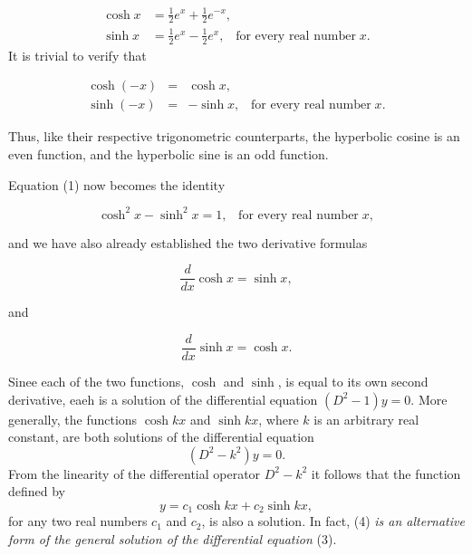 \begin{equation}
\begin{array}{ll}
\cosh x &= \frac{1}{2}e^x + \frac{1}{2}e^{-x},  \\ 
\sinh x &= \frac{1}{2}e^x - \frac{1}{2}e^{x}, \;\;\;\mbox{for every real number}\; x.  
\label{eq11.6.2}
\end{array}
\end{equation}
It is trivial to verify that 

\begin{theorem}
\begin{eqnarray*}
\cosh(-x) &=& \cosh x, \\
 \sinh(-x) &=& -\sinh x,\;\;\;\mbox{for every real number}\; x. 
\end{eqnarray*}
\end{theorem}
\noindent Thus, like their respective trigonometric counterparts, the hyperbolic cosine is an even function, and the hyperbolic sine is an odd function.

Equation (1) now becomes the identity 
\begin{theorem}
$$
\cosh^2 x - \sinh^2 x = 1, \;\;\;\mbox{for every real number}\; x,  
$$
\end{theorem}
\noindent and we have also already established the two derivative formulas
\begin{theorem}
$$
\frac{d}{dx} \cosh x = \sinh x,   
$$
\end{theorem}
\noindent and
\begin{theorem}
$$
\frac{d}{dx} \sinh x = \cosh x.  
$$
\end{theorem}

Sinee each of the two functions, $\cosh$ and $\sinh$, is equal to its own second derivative, eaeh is a solution of the differential equation $(D^2 - 1)y = 0$. More generally, the functions $\cosh kx$ and $\sinh kx$, where $k$ is an arbitrary real constant, are both solutions of the differential equation
\begin{equation}
(D^2 - k^2) y = 0.  
\label{eq11.6.3}
\end{equation}
From the linearity of the differential operator $D^2 - k^2$ it follows that the function defined by
\begin{equation}
y = c_1 \cosh kx + c_2 \sinh kx,
\label{eq11.6.4}
\end{equation}
for any two real numbers $c_1$ and $c_2$, is also a solution. In fact, (4) \textit{is an alternative form of the general solution of the differential equation} (3).

